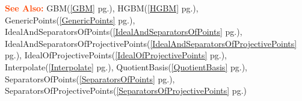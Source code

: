 \documentclass[a4paper]{mybook}
\newenvironment{command}{}{} %
\newcommand\SeeAlso{\par\textcolor{OrangeRed}{\textbf{\large See Also: }}}
\begin{document}
\begin{command}
\SeeAlso %
  GBM(\ref{GBM} pg.\pageref{GBM}), 
    HGBM(\ref{HGBM} pg.\pageref{HGBM}), 
    GenericPoints(\ref{GenericPoints} pg.\pageref{GenericPoints}), 
    IdealAndSeparatorsOfPoints(\ref{IdealAndSeparatorsOfPoints} pg.\pageref{IdealAndSeparatorsOfPoints}), 
    IdealAndSeparatorsOfProjectivePoints(\ref{IdealAndSeparatorsOfProjectivePoints} pg.\pageref{IdealAndSeparatorsOfProjectivePoints}), 
    IdealOfProjectivePoints(\ref{IdealOfProjectivePoints} pg.\pageref{IdealOfProjectivePoints}), 
    Interpolate(\ref{Interpolate} pg.\pageref{Interpolate}), 
    QuotientBasis(\ref{QuotientBasis} pg.\pageref{QuotientBasis}), 
    SeparatorsOfPoints(\ref{SeparatorsOfPoints} pg.\pageref{SeparatorsOfPoints}), 
    SeparatorsOfProjectivePoints(\ref{SeparatorsOfProjectivePoints} pg.\pageref{SeparatorsOfProjectivePoints})
\end{command} %
\end{document}
